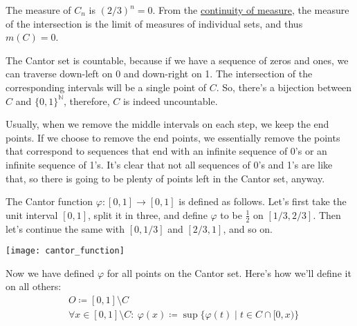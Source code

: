 \begin{remark}
    The measure of $C_n$ is $(2/3)^n = 0$. From the
    \hyperref[the:continuityOfMeasure]{continuity of measure},
    the measure of the intersection is the limit of measures of individual sets,
    and thus $m(C) = 0$.
\end{remark}

\begin{remark}
    The Cantor set is countable,
    because if we have a sequence of zeros and ones, we can traverse 
    down-left on 0 and down-right on 1. The intersection of the corresponding
    intervals will be a single point of $C$. So, there's a bijection between
    $C$ and $\{0, 1\}^\mathbb{N}$, therefore, $C$ is indeed uncountable. 
\end{remark}

\begin{remark}
    Usually, when we remove the middle intervals on each step,
    we keep the end points.
    If we choose to remove the end points, we essentially remove
    the points that correspond to sequences that end with an infinite
    sequence of 0's or an infinite sequence of 1's. 
    It's clear that not all sequences of 0's and 1's are like that, 
    so there is going to be plenty of points left in the Cantor set, anyway.
\end{remark}

\begin{definition}
    The Cantor function $\varphi: [0, 1] \to [0, 1]$ is defined as follows.
    Let's first take the unit interval $[0, 1]$, split it in three,
    and define $\varphi$ to be $\frac{1}{2}$ on $[1/3, 2/3]$. Then let's continue the same
    with $[0, 1/3]$ and $[2/3, 1]$, and so on.

    \begin{figure*}[h]
        \centering
        \texttt{[image: cantor\_function]}
    \end{figure*}

    Now we have defined $\varphi$ for all points on the Cantor set. Here's
    how we'll define it on all others:
    \begin{align*}
        &
        O \coloneqq [0, 1] \setminus C
        \\&
        \forall x \in [0, 1] \setminus C:\
        \varphi(x) \coloneqq \sup\{ \varphi(t) \mid t \in C \cap [0, x) \}
    \end{align*}
\end{definition}

